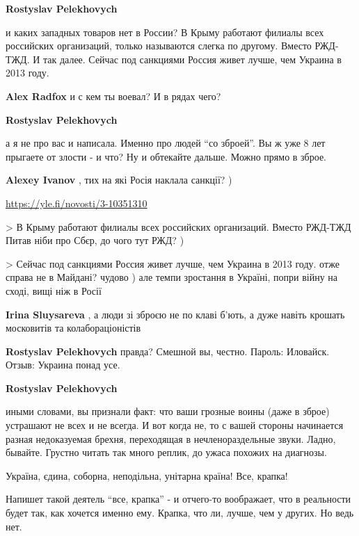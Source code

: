 \begin{itemize}
\begin{itemize}
\textbf{Rostyslav Pelekhovych} 

и каких западных товаров нет в России? В Крыму работают филиалы всех российских
организаций, только называются слегка по другому. Вместо РЖД-ТЖД. И так далее.
Сейчас под санкциями Россия живет лучше, чем Украина в 2013 году.

\textbf{Alex Radfox} и с кем ты воевал? И в рядах чего?

\textbf{Rostyslav Pelekhovych} 

а я не про вас и написала. Именно про людей \enquote{со зброей}. Вы ж уже 8 лет
прыгаете от злости - и что? Ну и обтекайте дальше. Можно прямо в зброе.

\textbf{Alexey Ivanov} , тих на які Росія наклала санкції? ) 

\url{https://yle.fi/novosti/3-10351310}

> В Крыму работают филиалы всех российских организаций. Вместо РЖД-ТЖД
Питав ніби про Сбєр, до чого тут РЖД? )

> Сейчас под санкциями Россия живет лучше, чем Украина в 2013 году.
отже справа не в Майдані? чудово ) але темпи зростання в Україні, попри війну на сході, вищі ніж в Росії

\textbf{Irina Sluysareva} , а люди зі зброєю не по клаві б'ють, а дуже навіть крошать московитів та колабораціоністів

\textbf{Rostyslav Pelekhovych} правда? Смешной вы, честно. Пароль: Иловайск. Отзыв: Украина понад усе.

\textbf{Rostyslav Pelekhovych} 

иными словами, вы признали факт: что ваши грозные воины (даже в зброе)
устрашают не всех и не всегда. И вот когда не, то с вашей стороны начинается
разная недоказуемая брехня, переходящая в нечленораздельные звуки. Ладно,
бывайте. Грустно читать так много реплик, до ужаса похожих на диагнозы.

\end{itemize} %

Україна, єдина, соборна, неподільна, унітарна країна! Все, крапка!

\begin{itemize} %

Напишет такой деятель \enquote{все, крапка} - и отчего-то воображает, что в реальности
будет так, как хочется именно ему. Крапка, что ли, лучше, чем у других. Но ведь
нет.



\end{itemize}
\end{itemize}
